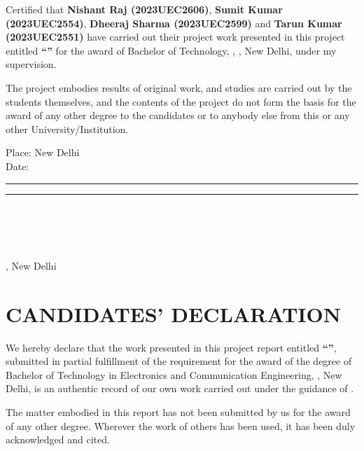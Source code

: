 Certified that \textbf{Nishant Raj (2023UEC2606)}, \textbf{Sumit Kumar (2023UEC2554)}, \textbf{Dheeraj Sharma
(2023UEC2599)} and \textbf{Tarun Kumar (2023UEC2551)} have carried out their project work presented in this
project entitled \textbf{``\ReportTitle''} for the award of Bachelor of Technology, \Department, \University,
New Delhi, under my supervision.

The project embodies results of original work, and studies are carried out by the students themselves, and the
contents of the project do not form the basis for the award of any other degree to the candidates or to anybody
else from this or any other University/Institution.

\vfill
\noindent
\begin{minipage}[b]{0.45\textwidth}
Place: New Delhi\\[10pt]
Date: \rule{3.5cm}{0.4pt}
\end{minipage}\hfill
\begin{minipage}[b]{0.48\textwidth}
\centering
\rule{5.5cm}{0.4pt}\\[4pt]
\textbf{\Supervisor}\\
\SupervisorDesignation\\
\Department\\
\University, New Delhi
\end{minipage}
\vspace*{1.2cm}
\endgroup

\chapter*{CANDIDATES' DECLARATION}
\begingroup
{}
\setlength{\parskip}{12pt}
\vspace*{0.6cm}

We hereby declare that the work presented in this project report entitled \textbf{``\ReportTitle''}, submitted
in partial fulfillment of the requirement for the award of the degree of Bachelor of Technology in Electronics
and Communication Engineering, \University, New Delhi, is an authentic record of our own work carried out under
the guidance of \textbf{\Supervisor}.

The matter embodied in this report has not been submitted by us for the award of any other degree. Wherever the
work of others has been used, it has been duly acknowledged and cited.

